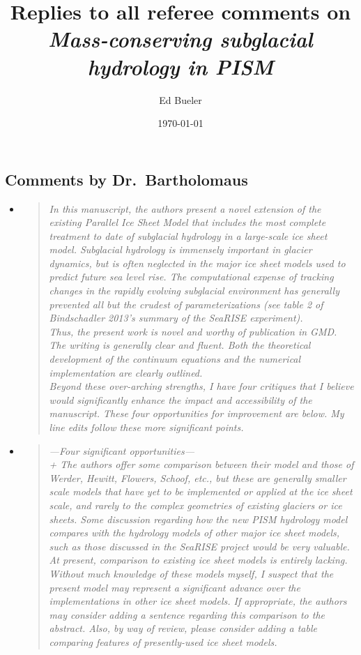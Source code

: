 \documentclass[11pt,reqno]{amsart}
\title[Replies to Referee Comments]{Replies to all referee comments on \\ \emph{Mass-conserving subglacial hydrology in PISM}}
\author{Ed Bueler}
\date{\today}
\newcommand{\reply}[2]{
\medskip\medskip
\item  \begin{quote}
\emph{#1}
\end{quote}

\medskip
\noindent #2}
\begin{document}
\maketitle

\thispagestyle{empty}


\subsection*{Comments by Dr.~Bartholomaus}\begin{itemize}

\reply{In this manuscript, the authors present a novel extension of the existing Parallel Ice Sheet Model that includes the most complete treatment to date of subglacial hydrology in a large-scale ice sheet model.  Subglacial hydrology is immensely important in glacier dynamics, but is often neglected in the major ice sheet models used to predict future sea level rise.  The computational expense of tracking changes in the rapidly evolving subglacial environment has generally prevented all but the crudest of parameterizations (see table 2 of Bindschadler 2013's summary of the SeaRISE experiment).\\
Thus, the present work is novel and worthy of publication in GMD.  The writing is generally clear and fluent.  Both the theoretical development of the continuum equations and the numerical implementation are clearly outlined.\\
Beyond these over-arching strengths, I have four critiques that I believe would significantly enhance the impact and accessibility of the manuscript. These four opportunities for improvement are below. My line edits follow these more significant points.}
{}

\reply{---Four significant opportunities---\\
+ The authors offer some comparison between
their model and those of Werder, Hewitt, Flowers, Schoof, etc., but these are generally smaller scale models that have yet to be implemented or applied at the ice sheet
scale, and rarely to the complex geometries of existing glaciers or ice sheets. Some
discussion regarding how the new PISM hydrology model compares with the hydrology models of other major ice sheet models, such as those discussed in the SeaRISE
project would be very valuable.  At present, comparison to existing ice sheet models is
entirely lacking.  Without much knowledge of these models myself, I suspect that the
present model may represent a significant advance over the implementations in other
ice sheet models.  If appropriate, the authors may consider adding a sentence regarding this comparison to the abstract.  Also, by way of review, please consider adding a
table comparing features of presently-used ice sheet models.}
{}


\end{itemize}
\end{document}
